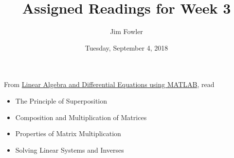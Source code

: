 \documentclass{homework}
\author{Jim Fowler}
\title{Assigned Readings for Week 3}
\date{Tuesday, September 4, 2018}
\begin{document}
\maketitle

From \href{/courses/43735/files/folder/textbooks}{Linear Algebra and Differential Equations using MATLAB}, read 
\begin{itemize}
\item {} The Principle of Superposition
\item {} Composition and Multiplication of Matrices
\item {} Properties of Matrix Multiplication
\item {} Solving Linear Systems and Inverses
\end{itemize}
\end{document}

